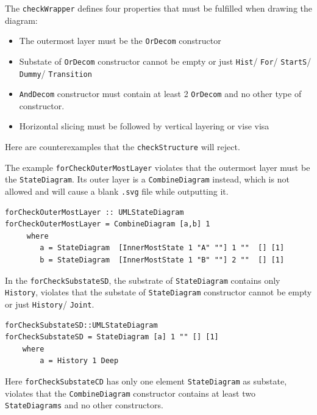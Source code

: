  
The \verb|checkWrapper| defines four properties that must be fulfilled when drawing the diagram:
\begin{itemize}
\item The outermost layer must be the \verb|OrDecom| constructor
\end{itemize}
\begin{itemize}
\item  Substate of \verb|OrDecom| constructor cannot be empty or just \verb|Hist|/ \verb|For|/ \verb|StartS|/ \verb|Dummy|/ \verb|Transition|
\end{itemize}
\begin{itemize}
\item \verb|AndDecom| constructor must contain at least 2 \verb|OrDecom| and no other type of constructor.
\end{itemize}
\begin{itemize}
\item Horizontal slicing must be followed by vertical layering or vise visa
\end{itemize}

Here are counterexamples that the \verb|checkStructure| will reject.

The example \verb|forCheckOuterMostLayer| violates that the outermost layer must be the \verb|StateDiagram|.
Its outer layer is a \verb|CombineDiagram| instead, which is not allowed and will cause a blank \verb|.svg| file while outputting it.

\begin{verbatim}
forCheckOuterMostLayer :: UMLStateDiagram
forCheckOuterMostLayer = CombineDiagram [a,b] 1
     where
        a = StateDiagram  [InnerMostState 1 "A" ""] 1 ""  [] [1]
        b = StateDiagram  [InnerMostState 1 "B" ""] 2 ""  [] [1]
\end{verbatim}

In the \verb|forCheckSubstateSD|, the substrate of \verb|StateDiagram| contains only \verb|History|, violates that the substate of \verb|StateDiagram| constructor cannot be empty or just \verb|History|/ \verb|Joint|.

\begin{verbatim}
forCheckSubstateSD::UMLStateDiagram
forCheckSubstateSD = StateDiagram [a] 1 "" [] [1]
    where
        a = History 1 Deep
\end{verbatim}

Here \verb|forCheckSubstateCD| has only one element \verb|StateDiagram| as substate, violates that the \verb|CombineDiagram| constructor contains at least two \verb|StateDiagrams| and no other constructors.

